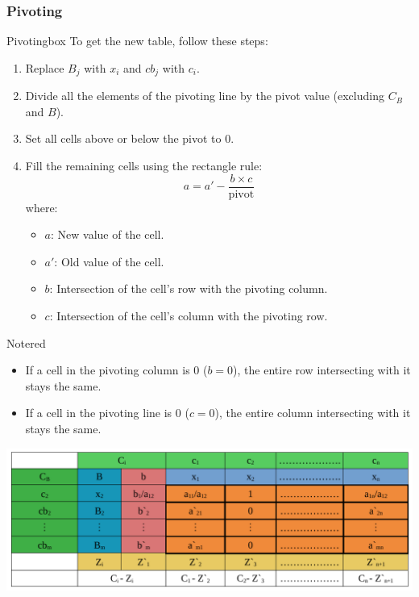 \subsubsection{Pivoting}
\begin{prettyBox}{Pivoting}{box}
To get the new table, follow these steps:
\begin{enumerate}
    \item Replace \(B_j\) with \(x_i\) and \(cb_j\) with \(c_i\).
    \item Divide all the elements of the pivoting line by the pivot value (excluding \(C_B\) and \(B\)).
    \item Set all cells above or below the pivot to 0.
    \item Fill the remaining cells using the rectangle rule:
        \[
        a = a' - \frac{b \times c}{\text{pivot}}
        \]
        where:
        \begin{itemize}
            \item \(a\): New value of the cell.
            \item \(a'\): Old value of the cell.
            \item \(b\): Intersection of the cell's row with the pivoting column.
            \item \(c\): Intersection of the cell's column with the pivoting row.
        \end{itemize}
\end{enumerate}
\end{prettyBox}

\vspace{0.5cm}

\begin{prettyBox}{Note}{red}
\begin{itemize}
    \item If a cell in the pivoting column is 0 (\(b = 0\)), the entire row intersecting with it stays the same.
    \item If a cell in the pivoting line is 0 (\(c = 0\)), the entire column intersecting with it stays the same.
\end{itemize}
\end{prettyBox}

\vspace{0.35cm}

\begin{center}
    \includegraphics{Chapters/Simplexe/pivot.pdf}
\end{center}


